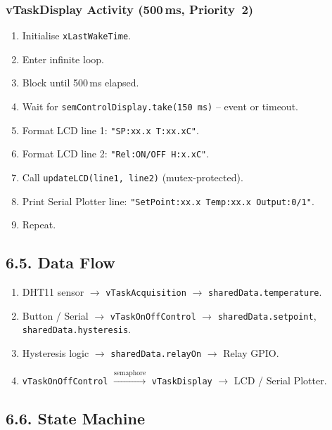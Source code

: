 \documentclass[12pt]{article}
\begin{document}
\subsubsection*{vTaskDisplay Activity (500\,ms, Priority~2)}

\begin{enumerate}
    \item Initialise \texttt{xLastWakeTime}.
    \item Enter infinite loop.
    \item Block until 500\,ms elapsed.
    \item Wait for \texttt{semControlDisplay.take(150\,ms)} -- event or timeout.
    \item Format LCD line 1: \texttt{"SP:xx.x T:xx.xC"}.
    \item Format LCD line 2: \texttt{"Rel:ON/OFF H:x.xC"}.
    \item Call \texttt{updateLCD(line1, line2)} (mutex-protected).
    \item Print Serial Plotter line:
          \texttt{"SetPoint:xx.x Temp:xx.x Output:0/1"}.
    \item Repeat.
\end{enumerate}

\subsection*{6.5. Data Flow}

\begin{enumerate}
    \item DHT11 sensor $\to$ \texttt{vTaskAcquisition} $\to$
          \texttt{sharedData.temperature}.
    \item Button / Serial $\to$ \texttt{vTaskOnOffControl} $\to$
          \texttt{sharedData.setpoint}, \texttt{sharedData.hysteresis}.
    \item Hysteresis logic $\to$ \texttt{sharedData.relayOn} $\to$ Relay GPIO.
    \item \texttt{vTaskOnOffControl} $\xrightarrow{\text{semaphore}}$
          \texttt{vTaskDisplay} $\to$ LCD / Serial Plotter.
\end{enumerate}

\subsection*{6.6. State Machine}
\end{document}
